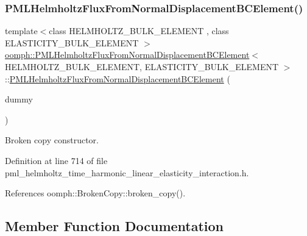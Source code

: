 \subsubsection{\texorpdfstring{P\+M\+L\+Helmholtz\+Flux\+From\+Normal\+Displacement\+B\+C\+Element()}{PMLHelmholtzFluxFromNormalDisplacementBCElement()}\hspace{0.1cm}{\footnotesize\ttfamily [2/2]}}
{\footnotesize\ttfamily template$<$class H\+E\+L\+M\+H\+O\+L\+T\+Z\+\_\+\+B\+U\+L\+K\+\_\+\+E\+L\+E\+M\+E\+NT , class E\+L\+A\+S\+T\+I\+C\+I\+T\+Y\+\_\+\+B\+U\+L\+K\+\_\+\+E\+L\+E\+M\+E\+NT $>$ \\
\hyperlink{classoomph_1_1PMLHelmholtzFluxFromNormalDisplacementBCElement}{oomph\+::\+P\+M\+L\+Helmholtz\+Flux\+From\+Normal\+Displacement\+B\+C\+Element}$<$ H\+E\+L\+M\+H\+O\+L\+T\+Z\+\_\+\+B\+U\+L\+K\+\_\+\+E\+L\+E\+M\+E\+NT, E\+L\+A\+S\+T\+I\+C\+I\+T\+Y\+\_\+\+B\+U\+L\+K\+\_\+\+E\+L\+E\+M\+E\+NT $>$\+::\hyperlink{classoomph_1_1PMLHelmholtzFluxFromNormalDisplacementBCElement}{P\+M\+L\+Helmholtz\+Flux\+From\+Normal\+Displacement\+B\+C\+Element} (\begin{DoxyParamCaption}\item[{const \hyperlink{classoomph_1_1PMLHelmholtzFluxFromNormalDisplacementBCElement}{P\+M\+L\+Helmholtz\+Flux\+From\+Normal\+Displacement\+B\+C\+Element}$<$ H\+E\+L\+M\+H\+O\+L\+T\+Z\+\_\+\+B\+U\+L\+K\+\_\+\+E\+L\+E\+M\+E\+NT, E\+L\+A\+S\+T\+I\+C\+I\+T\+Y\+\_\+\+B\+U\+L\+K\+\_\+\+E\+L\+E\+M\+E\+NT $>$ \&}]{dummy }\end{DoxyParamCaption})\hspace{0.3cm}{\ttfamily [inline]}}



Broken copy constructor. 



Definition at line 714 of file pml\+\_\+helmholtz\+\_\+time\+\_\+harmonic\+\_\+linear\+\_\+elasticity\+\_\+interaction.\+h.



References oomph\+::\+Broken\+Copy\+::broken\+\_\+copy().



\subsection{Member Function Documentation}
\mbox{\label{classoomph_1_1PMLHelmholtzFluxFromNormalDisplacementBCElement_a159c7c508fc565f7d70481cd467a5152}} 
